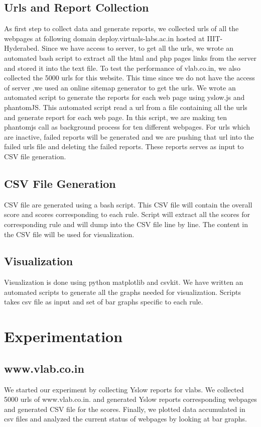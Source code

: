 \documentclass[conference]{IEEEtran}
\begin{document}
\subsection{Urls and Report Collection}\label{sec-4.1}
As first step to collect data and generate reports, we
collected urls of all the webpages at following domain deploy.virtuals-labs.ac.in hosted at
IIIT-Hyderabed. Since we have access to server, to get all the urls, we wrote an
automated bash script to extract all the html and php pages links from the
server and stored it into the text file.
To test the performance of vlab.co.in, we also collected the 5000 urls for this
website. This time since we do not have the access of server ,we used an online
sitemap generator to get the urls.
We wrote an automated script to generate the reports for each web page using
yslow.js and phantomJS. This automated script read a url from a file containing
all the urls and generate report for each web page. In this script, we are making
ten phantomjs call as background process for ten different webpages. For urls which are inactive, failed reports will
be generated and we are pushing that url into the failed urls file and deleting
the failed reports. These reports serves as input to CSV file generation.

\subsection{CSV File Generation}\label{sec-4.2}
CSV file are generated using a bash script. This CSV file will contain the overall
score and scores corresponding to each rule. Script will extract all the scores
for corresponding rule and will dump into the CSV file line by line. The
content in the CSV file will be used for visualization.

\subsection{Visualization}\label{sec-4.3}
Visualization is done using python matplotlib and csvkit. We have written an automated
scripts to generate all the graphs needed for visualization. Scripts takes csv file as input
and set of bar graphs specific to each rule.

\section{Experimentation}\label{sec-5}

\subsection{www.vlab.co.in}\label{sec-5.1}
We started our experiment by collecting Yslow reports for vlabs. 
We collected 5000 urls of www.vlab.co.in. and generated
Yslow reports corresponding webpages and generated CSV file for the
scores. Finally, we plotted data accumulated in csv files and analyzed the
current status of webpages by looking at bar graphs.
\end{document}
